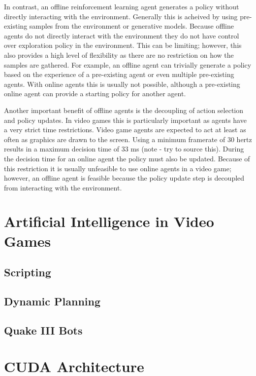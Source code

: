 In contrast, an offline reinforcement learning agent generates a policy without directly interacting with the environment. Generally this is acheived by using pre-existing samples from the environment or generative models. Because offline agents do not directly interact with the environment they do not have control over exploration policy in the environment. This can be limiting; however, this also provides a high level of flexibility as there are no restriction on how the samples are gathered. For example, an offline agent can trivially generate a policy based on the experience of a pre-existing agent or even multiple pre-existing agents. With online agents this is usually not possible, although a pre-existing online agent can provide a starting policy for another agent.

Another important benefit of offline agents is the decoupling of action selection and policy updates. In video games this is particularly important as agents have a very strict time restrictions. Video game agents are expected to act at least as often as graphics are drawn to the screen. Using a minimum framerate of 30 hertz results in a maximum decision time of 33 ms (note - try to source this). During the decision time for an online agent the policy must also be updated. Because of this restriction it is usually unfeasible to use online agents in a video game; however, an offline agent is feasible because the policy update step is decoupled from interacting with the environment.

\section{Artificial Intelligence in Video Games}

\subsection{Scripting}

\subsection{Dynamic Planning}

\subsection{Quake III Bots}

\section{CUDA Architecture}